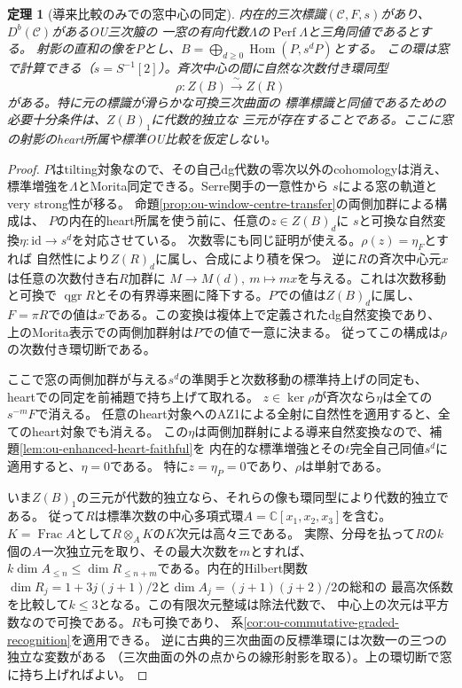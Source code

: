 \documentclass[11pt,a4paper]{ltjsarticle}
\newtheorem{theorem}{定理}[section]
\theoremstyle{definition}
\newcommand{\qgr}{\operatorname{qgr}}
\newcommand{\Perf}{\operatorname{Perf}}
\begin{document}
\begin{theorem}[導来比較のみでの窓中心の同定]
\label{thm:ou-derived-reduced-centre}
内在的三次標識$(\mathcal C,F,s)$があり、$D^b(\mathcal C)$があるOU三次箙の
一窓の有向代数$\Lambda$の$\Perf\Lambda$と三角同値であるとする。
射影の直和の像を$P$とし、$B=\bigoplus_{d\ge0}\operatorname{Hom}(P,s^dP)$とする。
この環は窓で計算できる（$s=S^{-1}[2]$）。斉次中心の間に自然な次数付き環同型
\[
 \rho:Z(B)\xrightarrow{\ \sim\ } Z(R)
\]
がある。特に元の標識が滑らかな可換三次曲面の
標準標識と同値であるための必要十分条件は、$Z(B)_1$に代数的独立な
三元が存在することである。ここに窓の射影のheart所属や標準OU比較を仮定しない。
\end{theorem}
\begin{proof}
$P$はtilting対象なので、その自己dg代数の零次以外のcohomologyは消え、
標準増強を$\Lambda$とMorita同定できる。Serre関手の一意性から
$s$による窓の軌道とvery strong性が移る。
命題\ref{prop:ou-window-centre-transfer}の両側加群による構成は、
$P$の内在的heart所属を使う前に、任意の$z\in Z(B)_d$に
$s$と可換な自然変換$\eta:\mathrm{id}\to s^d$を対応させている。
次数零にも同じ証明が使える。$\rho(z)=\eta_F$とすれば
自然性により$Z(R)_d$に属し、合成により積を保つ。
逆に$R$の斉次中心元$x$は任意の次数付き右$R$加群に
$M\to M(d),\ m\mapsto mx$を与える。これは次数移動と可換で
$\qgr R$とその有界導来圏に降下する。$P$での値は$Z(B)_d$に属し、
$F=\pi R$での値は$x$である。この変換は複体上で定義されたdg自然変換であり、
上のMorita表示での両側加群射は$P$での値で一意に決まる。
従ってこの構成は$\rho$の次数付き環切断である。

ここで窓の両側加群が与える$s^d$の準関手と次数移動の標準持上げの同定も、
heartでの同定を前補題で持ち上げて取れる。
$z\in\ker\rho$が斉次なら$\eta$は全ての$s^{-m}F$で消える。
任意のheart対象へのAZ1による全射に自然性を適用すると、全てのheart対象でも消える。
この$\eta$は両側加群射による導来自然変換なので、補題\ref{lem:ou-enhanced-heart-faithful}を
内在的な標準増強とその$t$完全自己同値$s^d$に適用すると、$\eta=0$である。
特に$z=\eta_P=0$であり、$\rho$は単射である。

いま$Z(B)_1$の三元が代数的独立なら、それらの像も環同型により代数的独立である。
従って$R$は標準次数の中心多項式環$A=\mathbb C[x_1,x_2,x_3]$を含む。
$K=\operatorname{Frac} A$として$R\otimes_A K$の$K$次元は高々三である。
実際、分母を払って$R$の$k$個の$A$一次独立元を取り、その最大次数を$m$とすれば、
$k\dim A_{\le n}\le\dim R_{\le n+m}$である。内在的Hilbert関数
$\dim R_j=1+3j(j+1)/2$と$\dim A_j=(j+1)(j+2)/2$の総和の
最高次係数を比較して$k\le3$となる。この有限次元整域は除法代数で、
中心上の次元は平方数なので可換である。$R$も可換であり、
系\ref{cor:ou-commutative-graded-recognition}を適用できる。
逆に古典的三次曲面の反標準環には次数一の三つの独立な変数がある
（三次曲面の外の点からの線形射影を取る）。上の環切断で窓に持ち上げればよい。
\end{proof}
\end{document}
